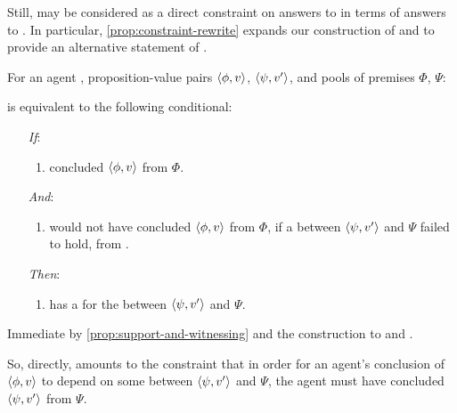 \begin{note}
  Still, \issueConstraint{} may be considered as a direct constraint on answers to \qWhyVnP{} in terms of answers to \qHow{}.
  In particular, \autoref{prop:constraint-rewrite} expands our construction of \qWhyVnP{}  and \qHowV{} to provide an alternative statement of \issueConstraint{}.

  \begin{proposition}
    \label{prop:constraint-rewrite}
    For an agent \vAgent{}, proposition-value pairs \(\langle \phi, v \rangle\), \(\langle \psi, v' \rangle\), and pools of premises \(\Phi\), \(\Psi\):

    \issueConstraint{} is equivalent to the following conditional:

    \begin{enumerate}
    \item[\emph{If}:]
      \begin{enumerate}[label=\alph*., ref=(\alph*)]
      \item
        \vAgent{} concluded \(\langle \phi, v \rangle\) from \(\Phi\).
      \end{enumerate}
    \item[\emph{And}:]
      \begin{enumerate}[label=\alph*., ref=(\alph*), resume]
      \item
        \vAgent{} would not have concluded \(\langle \phi, v \rangle\) from \(\Phi\), if a \ros{} between \(\langle \psi, v' \rangle\) and \(\Psi\) failed to hold, from .
      \end{enumerate}
    \item[\emph{Then}:]
      \begin{enumerate}[label=\alph*., ref=(\alph*), resume]
      \item
        \vAgent{} has a  for the \ros{} between \(\langle \psi, v' \rangle\) and \(\Psi\).
      \end{enumerate}
    \end{enumerate}
    \begin{argument}
      Immediate by \autoref{prop:support-and-witnessing} and the construction to \qWhyVnP{} and \qHowV{}.
    \end{argument}
  \end{proposition}

  So, directly, \issueConstraint{} amounts to the constraint that in order for an agent's conclusion of \(\langle \phi, v \rangle\) to depend on some \ros{} between \(\langle \psi, v' \rangle\) and \(\Psi\), the agent must have concluded \(\langle \psi, v' \rangle\) from \(\Psi\).
\end{note}

